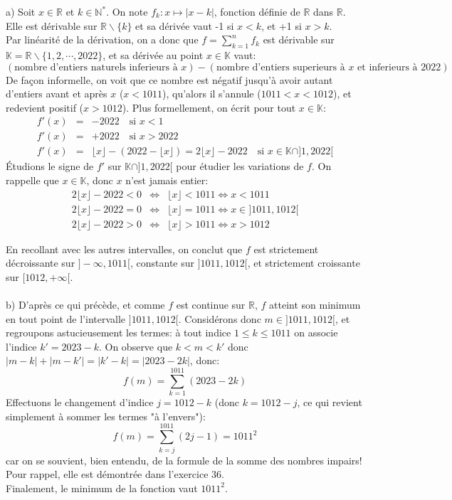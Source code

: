 a) Soit $x\in\mathbb{R}$ et $k\in\mathbb{N}^*$. On note $f_k:x\mapsto |x-k|$, fonction définie de $\mathbb{R}$ dans $\mathbb{R}$. \\
Elle est dérivable sur $\mathbb{R}\backslash{\{k\}}$ et sa dérivée vaut -1 si $x<k$, et +1 si $x>k$.\\
 Par linéarité de la dérivation, on a donc que $f=\sum_{k=1}^n{f_k}$ est dérivable sur $\mathbb{K}=\mathbb{R}\backslash\{1,2,\cdots,2022\}$,
 et sa dérivée au point $x\in\mathbb{K}$ vaut:
 \[
 (\textrm{nombre d'entiers naturels inferieurs à }x) - (\textrm{nombre d'entiers superieurs à } x \textrm{ et inferieurs à 2022})
 \]
 De façon informelle, on voit que ce nombre est négatif jusqu’à avoir autant d'entiers avant et après $x$ ($x<1011$), qu'alors il s'annule ($1011 < x < 1012$), et redevient positif ($x>1012$). Plus formellement, on écrit pour tout $x\in\mathbb{K}$:
\begin{eqnarray}
  f'(x) &=& -2022 \quad \textrm{si } x < 1 \nonumber \\
  f'(x) &=& +2022 \quad \textrm{si } x > 2022 \nonumber \\
  f'(x) &=& \lfloor x \rfloor - (2022-\lfloor x \rfloor)=2\lfloor x \rfloor -2022 \quad \textrm{si } x \in \mathbb{K}\cap ]1,2022[ \nonumber 
\end{eqnarray}
 Étudions le signe de $f'$ sur $\mathbb{K}\cap ]1,2022[$ pour étudier les variations de $f$. On rappelle que $x\in\mathbb{K}$, donc $x$ n'est jamais entier:
 \begin{eqnarray}
2\lfloor x \rfloor -2022 < 0 &\Leftrightarrow & \lfloor x \rfloor < 1011 \Leftrightarrow x < 1011 \nonumber \\
2\lfloor x \rfloor -2022 = 0 &\Leftrightarrow & \lfloor x \rfloor = 1011 \Leftrightarrow x \in ]1011, 1012[ \nonumber \\
2\lfloor x \rfloor -2022 > 0 &\Leftrightarrow & \lfloor x \rfloor > 1011 \Leftrightarrow x > 1012 \nonumber
 \end{eqnarray}

En recollant avec les autres intervalles, on conclut que $f$ est strictement décroissante sur $]-\infty, 1011[$, constante sur $]1011, 1012[$, et strictement croissante sur $[1012, +\infty[$. \\ \\
b) D’après ce qui précède, et comme $f$ est continue sur $\mathbb{R}$, $f$ atteint son minimum en tout point de l'intervalle $]1011,1012[$. Considérons donc $m\in]1011,1012[$, et regroupons astucieusement les termes: à tout indice $1 \leq k\leq 1011$ on associe l'indice $k'=2023-k$. On observe que $k<m<k'$ donc $|m-k|+|m-k'|=|k'-k|=|2023-2k|$, donc:
\[
f(m)=\sum_{k=1}^{1011}{(2023-2k)}
\]
Effectuons le changement d'indice $j=1012-k$ (donc $k=1012-j$, ce qui revient simplement à sommer les termes "à l'envers"):
\[
f(m)=\sum_{k=j}^{1011}{(2j-1)}=1011^2
\]
car on se souvient, bien entendu, de la formule de la somme des nombres impairs! Pour rappel, elle est démontrée dans l'exercice 36.\\
Finalement, le minimum de la fonction vaut $1011^2$.
